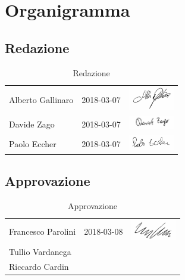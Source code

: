 \section{Organigramma}
	\subsection{Redazione}
	\begin{table}[H]
	\centering
	\begin{tabular}{|p{4cm}|C{4cm}|C{5cm}|}
	\hline
		 & & \\
		\hline	
		Alberto Gallinaro & 2018-03-07 & \includegraphics[width=2cm]{../../CommonImages/firme/alberto.png}  \\
		\hline
		Davide Zago & 2018-03-07 & \includegraphics[width=2cm]{../../CommonImages/firme/davide.png} \\
		\hline
		Paolo Eccher & 2018-03-07 & \includegraphics[width=2cm]{../../CommonImages/firme/paolo.png} \\
		\hline
	\end{tabular}
	\caption{Redazione}
	\end{table}
	
	\subsection{Approvazione}
	\begin{table}[H]
		\centering
		\begin{tabular}{|p{4cm}|C{4cm}|C{5cm}|}
			\hline
			 & & \\
			\hline			
			Francesco Parolini & 2018-03-08 & \includegraphics[width=2cm]{../../CommonImages/firme/freppo.png}  \\
			\hline
			Tullio Vardanega &  &  \\
			\hline
			Riccardo Cardin &  &  \\
			\hline
		\end{tabular}
		\caption{Approvazione}
	\end{table}
	
